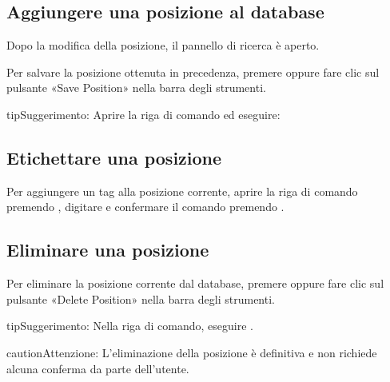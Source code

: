 \documentclass[letterpaper,10pt,italian]{sphinxmanual}
\begin{document}
\subsection{Aggiungere una posizione al database}
\label{\detokenize{guide_utilisateur:ajouter-une-position-a-la-base-de-donnees}}
\sphinxAtStartPar
Dopo la modifica della posizione, il pannello di ricerca è aperto.

\sphinxAtStartPar
Per salvare la posizione ottenuta in precedenza, premere  oppure fare clic sul pulsante «Save Position» nella barra degli strumenti.

\begin{sphinxadmonition}{tip}{Suggerimento:}
\sphinxAtStartPar
Aprire la riga di comando ed eseguire: 
\end{sphinxadmonition}


\subsection{Etichettare una posizione}
\label{\detokenize{guide_utilisateur:etiqueter-une-position}}
\sphinxAtStartPar
Per aggiungere un tag  alla posizione corrente, aprire la riga di comando premendo , digitare  e confermare il comando premendo .


\subsection{Eliminare una posizione}
\label{\detokenize{guide_utilisateur:supprimer-une-position}}
\sphinxAtStartPar
Per eliminare la posizione corrente dal database, premere  oppure fare clic sul pulsante «Delete Position» nella barra degli strumenti.

\begin{sphinxadmonition}{tip}{Suggerimento:}
\sphinxAtStartPar
Nella riga di comando, eseguire .
\end{sphinxadmonition}

\begin{sphinxadmonition}{caution}{Attenzione:}
\sphinxAtStartPar
L’eliminazione della posizione è definitiva e non richiede alcuna conferma da parte dell’utente.
\end{sphinxadmonition}
\end{document}
